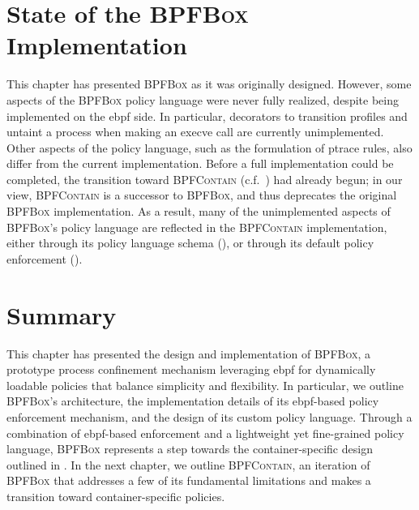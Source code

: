 \documentclass[
  fontsize=12pt,
  titlepage=firstiscover,
  paper=letter,
oneside,
  cleardoublepage=plain,
  parskip=half-,
  DIV=10,
  parindent,
  appendixprefix,
  chapterprefix,
  listof=totoc,
]{scrbook}
\newcommand{\bpfbox}{\textsc{BPFBox}}
\newcommand{\bpfcontain}{\textsc{BPFContain}}
\begin{document}
\section{State of the \bpfbox{} Implementation}
\label{s:bpfbox-discrepancies}

This chapter has presented \bpfbox{} as it was originally designed. However, some aspects
of the \bpfbox{} policy language were never fully realized, despite being implemented on
the \gls{ebpf} side. In particular, decorators to transition profiles and untaint
a process when making an execve call are currently unimplemented. Other aspects of the
policy language, such as the formulation of ptrace rules, also differ from the current
implementation. Before a full implementation could be completed, the transition toward
\bpfcontain{} (c.f.\ ) had already begun; in our view, \bpfcontain{} is
a successor to \bpfbox{}, and thus deprecates the original \bpfbox{} implementation. As
a result, many of the unimplemented aspects of \bpfbox{}'s policy language are reflected
in the \bpfcontain{} implementation, either through its policy language schema
(), or through its default policy enforcement
().



\section{Summary}\label{s:bpfbox-summary}

This chapter has presented the design and implementation of \bpfbox{}, a prototype process
confinement mechanism leveraging \gls{ebpf} for dynamically loadable policies that balance
simplicity and flexibility. In particular, we outline \bpfbox{}'s architecture, the
implementation details of its \gls{ebpf}-based policy enforcement mechanism, and the
design of its custom policy language. Through a combination of \gls{ebpf}-based
enforcement and a lightweight yet fine-grained policy language, \bpfbox{} represents
a step towards the container-specific design outlined in .  In the next
chapter, we outline \bpfcontain{}, an iteration of \bpfbox{} that addresses a few of its
fundamental limitations and makes a transition toward container-specific policies.
\end{document}

